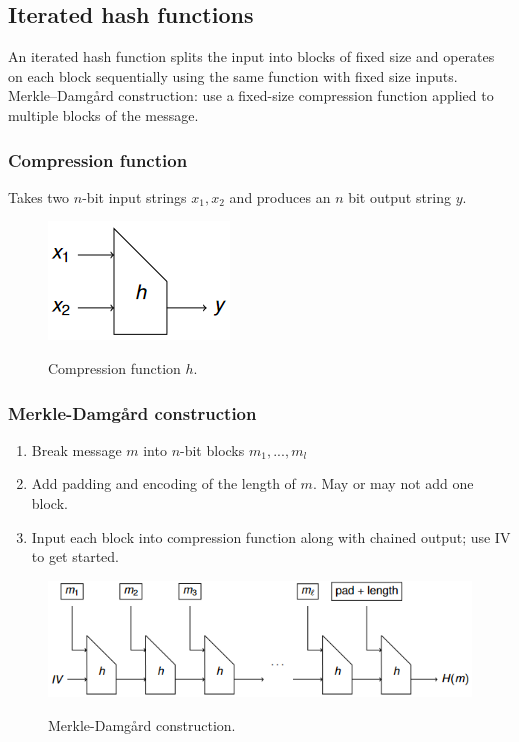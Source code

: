 \documentclass{article}
\begin{document}
\subsection{Iterated hash functions}

An iterated hash function splits the input into blocks of fixed size and operates on each block sequentially using the same function with fixed size inputs.\\
Merkle–Damgård construction: use a fixed-size compression function applied to multiple blocks of the message.

\subsubsection{Compression function}

Takes two $n$-bit input strings $x_1, x_2$ and produces an $n$ bit output string $y$.

\begin{figure}[H]
\centering
\includegraphics[scale=0.75]{Images/compressionfunction.png}
\label{fig:fround}
\caption{Compression function $h$.}
\end{figure}

\subsubsection{Merkle-Damgård construction}

\begin{enumerate}
    \item Break message $m$ into $n$-bit blocks $m_1, ..., m_l$
    \item Add padding and encoding of the length of $m$. May or may not add one block.
    \item Input each block into compression function along with chained output; use IV to get started.
\end{enumerate}

\begin{figure}[H]
\centering
\includegraphics[scale=0.75]{Images/derklamangard.png}
\label{fig:fround}
\caption{Merkle-Damgård construction.}
\end{figure}
\end{document}
